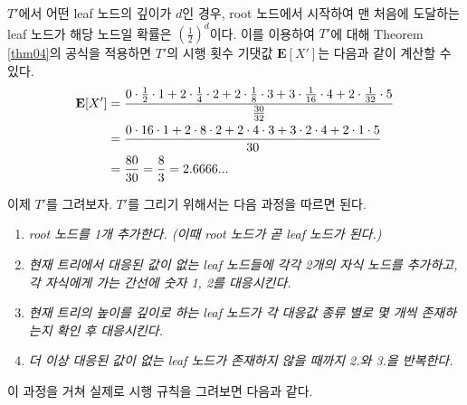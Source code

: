\documentclass[11pt]{article}
\begin{document}
$T'$에서 어떤 leaf 노드의 깊이가 $d$인 경우, root 노드에서 시작하여 맨 처음에 도달하는 leaf 노드가 해당 노드일 확률은 $\left(\frac{1}{2}\right)^{d}$이다. 이를 이용하여 $T'$에 대해 Theorem \ref{thm04}의 공식을 적용하면 $T'$의 시행 횟수 기댓값 $\textbf{E}[X']$는 다음과 같이 계산할 수 있다.
\[
\begin{split}
\textnormal{\textbf{E}}[X'] & = \frac{0 \cdot \frac{1}{2} \cdot 1 + 2 \cdot \frac{1}{4} \cdot 2 + 2 \cdot \frac{1}{8} \cdot 3 + 3 \cdot \frac{1}{16} \cdot 4 + 2 \cdot \frac{1}{32} \cdot 5}{\frac{30}{32}}\\
& = \frac{0 \cdot 16 \cdot 1 + 2 \cdot 8 \cdot 2 + 2 \cdot 4 \cdot 3 + 3 \cdot 2 \cdot 4 + 2 \cdot 1 \cdot 5}{30}\\
& = \frac{80}{30} = \frac{8}{3} = 2.6666...
\end{split}
\]

이제 $T'$를 그려보자. $T'$를 그리기 위해서는 다음 과정을 따르면 된다.

\singlespacing
\begin{enumerate}[\itshape1.]
    \item \textit{root 노드를 1개 추가한다. (이때 root 노드가 곧 leaf 노드가 된다.)}
    \item \textit{현재 트리에서 대응된 값이 없는 leaf 노드들에 각각 2개의 자식 노드를 추가하고, 각 자식에게 가는 간선에 숫자 1, 2를 대응시킨다.}
    \item \textit{현재 트리의 높이를 깊이로 하는 leaf 노드가 각 대응값 종류 별로 몇 개씩 존재하는지 확인 후 대응시킨다.}
    \item \textit{더 이상 대응된 값이 없는 leaf 노드가 존재하지 않을 때까지 2.와 3.을 반복한다.}
\end{enumerate}
\doublespacing

\noindent 이 과정을 거쳐 실제로 시행 규칙을 그려보면 다음과 같다.\\
\end{document}

